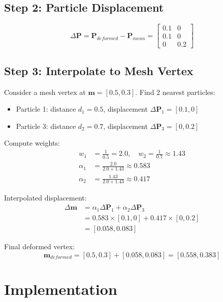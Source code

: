 \documentclass[12pt,a4paper]{article}
\begin{document}
\subsection{Step 2: Particle Displacement}

\begin{equation}
\Delta \mathbf{P} = \mathbf{P}_{deformed} - \mathbf{P}_{mean} = \begin{bmatrix} 0.1 & 0 \\ 0.1 & 0 \\ 0 & 0.2 \end{bmatrix}
\end{equation}

\subsection{Step 3: Interpolate to Mesh Vertex}

Consider a mesh vertex at $\mathbf{m} = [0.5, 0.3]$. Find 2 nearest particles:
\begin{itemize}
    \item Particle 1: distance $d_1 = 0.5$, displacement $\Delta \mathbf{P}_1 = [0.1, 0]$
    \item Particle 3: distance $d_2 = 0.7$, displacement $\Delta \mathbf{P}_3 = [0, 0.2]$
\end{itemize}

Compute weights:
\begin{align}
w_1 &= \frac{1}{0.5} = 2.0, \quad w_2 = \frac{1}{0.7} \approx 1.43 \\
\alpha_1 &= \frac{2.0}{2.0 + 1.43} \approx 0.583 \\
\alpha_2 &= \frac{1.43}{2.0 + 1.43} \approx 0.417
\end{align}

Interpolated displacement:
\begin{align}
\Delta \mathbf{m} &= \alpha_1 \Delta \mathbf{P}_1 + \alpha_2 \Delta \mathbf{P}_3 \\
&= 0.583 \times [0.1, 0] + 0.417 \times [0, 0.2] \\
&= [0.058, 0.083]
\end{align}

Final deformed vertex:
\begin{equation}
\mathbf{m}_{deformed} = [0.5, 0.3] + [0.058, 0.083] = [0.558, 0.383]
\end{equation}

\section{Implementation}
\end{document}
